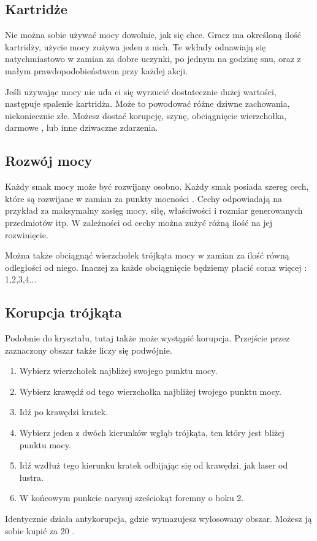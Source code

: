 \subsection{Kartridże}
Nie można sobie używać mocy dowolnie, jak się chce.
Gracz ma określoną ilość kartridży, użycie mocy zużywa jeden z nich.
Te wkłady odnawiają się natychmiastowo w zamian za dobre uczynki, po jednym na godzinę snu, oraz z małym prawdopodobieństwem przy każdej akcji.

Jeśli używając mocy nie uda ci się wyrzucić dostatecznie dużej wartości, następuje spalenie kartridża.
Może to powodować różne dziwne zachowania, niekoniecznie złe.
Możesz dostać korupcję, szynę, obciągnięcie wierzchołka, darmowe \xpmcn{}, lub inne dziwaczne zdarzenia. 

\subsection{Rozwój mocy}
Każdy smak mocy może być rozwijany osobno.
Każdy smak posiada szereg cech, które są rozwijane w zamian za punkty mocności \xpmcn{}.
Cechy odpowiadają na przykład za maksymalny zasięg mocy, siłę, właściwości i rozmiar generowanych przedmiotów itp.
W zależności od cechy można zużyć różną ilość \xpmcn{} na jej rozwinięcie.

Można także obciągnąć wierzchołek trójkąta mocy w zamian za ilość \xpmcn{} równą odległości od niego. 
Inaczej za każde obciągnięcie będziemy płacić coraz więcej \xpmcn{}: 1,2,3,4...

\subsection{Korupcja trójkąta}
Podobnie do kryształu, tutaj także może wystąpić korupcja.
Przejście przez zaznaczony obszar także liczy się podwójnie.
\begin{enumerate}
 \item Wybierz wierzchołek najbliżej swojego punktu mocy.
 \item Wybierz krawędź od tego wierzchołka najbliżej twojego punktu mocy.
 \item Idź po krawędzi \dxx{} kratek.
 \item Wybierz jeden z dwóch kierunków wgłąb trójkąta, ten który jest bliżej punktu mocy.
 \item Idź wzdłuż tego kierunku \dxx[5]{} kratek odbijając się od krawędzi, jak laser od lustra.
 \item W końcowym punkcie narysuj sześciokąt foremny o boku 2.
\end{enumerate}
Identycznie działa antykorupcja, gdzie wymazujesz wylosowany obszar. Możesz ją sobie kupić za 20 \xpmcn{}.

